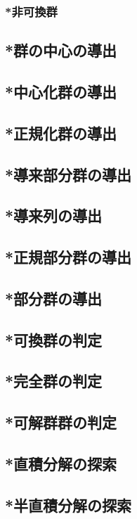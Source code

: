 \documentclass[11pt, a4paper]{jsarticle}
\begin{document}
\subsubsection{*非可換群}\label{sec:isomorphic_non_abelian}

\subsection{*群の中心の導出}

\subsection{*中心化群の導出}

\subsection{*正規化群の導出}

\subsection{*導来部分群の導出}

\subsection{*導来列の導出}

\subsection{*正規部分群の導出}

\subsection{*部分群の導出}

\subsection{*可換群の判定}

\subsection{*完全群の判定}

\subsection{*可解群群の判定}

\subsection{*直積分解の探索}

\subsection{*半直積分解の探索}


\end{document}
